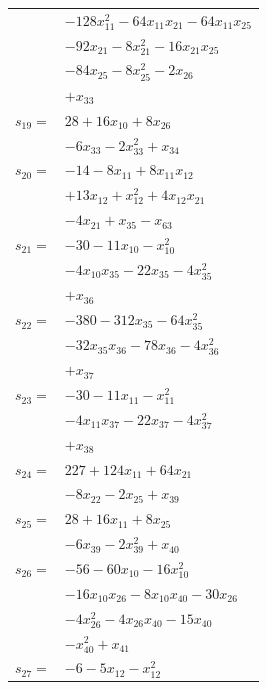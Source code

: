 \begin{longtable}{@{}r@{\;}l@{}}
 & \(\displaystyle -128x_{11}^{2} -64x_{11}x_{21} -64x_{11}x_{25}\) \\
 & \(\displaystyle -92x_{21} -8x_{21}^{2} -16x_{21}x_{25}\) \\
 & \(\displaystyle -84x_{25} -8x_{25}^{2} -2x_{26}\) \\
 & \(\displaystyle +x_{33}\) \\[3pt]
\(s_{19}=\) & \(\displaystyle 28 +16x_{10} +8x_{26}\) \\
 & \(\displaystyle -6x_{33} -2x_{33}^{2} +x_{34}\) \\[3pt]
\(s_{20}=\) & \(\displaystyle -14 -8x_{11} +8x_{11}x_{12}\) \\
 & \(\displaystyle +13x_{12} +x_{12}^{2} +4x_{12}x_{21}\) \\
 & \(\displaystyle -4x_{21} +x_{35} -x_{63}\) \\[3pt]
\(s_{21}=\) & \(\displaystyle -30 -11x_{10} -x_{10}^{2}\) \\
 & \(\displaystyle -4x_{10}x_{35} -22x_{35} -4x_{35}^{2}\) \\
 & \(\displaystyle +x_{36}\) \\[3pt]
\(s_{22}=\) & \(\displaystyle -380 -312x_{35} -64x_{35}^{2}\) \\
 & \(\displaystyle -32x_{35}x_{36} -78x_{36} -4x_{36}^{2}\) \\
 & \(\displaystyle +x_{37}\) \\[3pt]
\(s_{23}=\) & \(\displaystyle -30 -11x_{11} -x_{11}^{2}\) \\
 & \(\displaystyle -4x_{11}x_{37} -22x_{37} -4x_{37}^{2}\) \\
 & \(\displaystyle +x_{38}\) \\[3pt]
\(s_{24}=\) & \(\displaystyle 227 +124x_{11} +64x_{21}\) \\
 & \(\displaystyle -8x_{22} -2x_{25} +x_{39}\) \\[3pt]
\(s_{25}=\) & \(\displaystyle 28 +16x_{11} +8x_{25}\) \\
 & \(\displaystyle -6x_{39} -2x_{39}^{2} +x_{40}\) \\[3pt]
\(s_{26}=\) & \(\displaystyle -56 -60x_{10} -16x_{10}^{2}\) \\
 & \(\displaystyle -16x_{10}x_{26} -8x_{10}x_{40} -30x_{26}\) \\
 & \(\displaystyle -4x_{26}^{2} -4x_{26}x_{40} -15x_{40}\) \\
 & \(\displaystyle -x_{40}^{2} +x_{41}\) \\[3pt]
\(s_{27}=\) & \(\displaystyle -6 -5x_{12} -x_{12}^{2}\) \\

\end{longtable}
